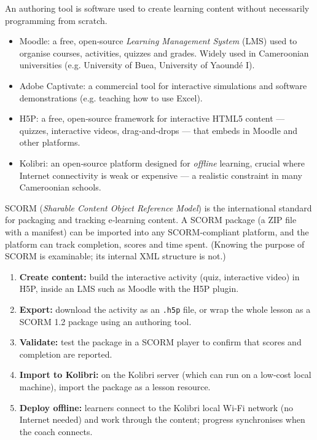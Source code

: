 \documentclass[11pt]{article}
\newcommand{\cle}[1]{{\popxbold\color{popdark}#1}}
\newcounter{popsec}
\newcounter{popsub}
\newcommand{\courssub}[1]{%
  \stepcounter{popsub}%
  \par\vspace{9pt}\noindent{\popxbold\fontsize{11.5}{13}\selectfont\color{popink}{\color{poporange}\thepopsec.\thepopsub}\hspace{6pt}#1}\par\nopagebreak\vspace{4pt}
}
\begin{document}
\courssub{Authoring Tools for CAL}

An \cle{authoring tool} is software used to create learning content without necessarily programming from scratch.

\begin{itemize}
\item \cle{Moodle}: a free, open‑source \emph{Learning Management System} (LMS) used to organise courses, activities, quizzes and grades. Widely used in Cameroonian universities (e.g. University of Buea, University of Yaoundé I).
\item \cle{Adobe Captivate}: a commercial tool for interactive simulations and software demonstrations (e.g. teaching how to use Excel).
\item \cle{H5P}: a free, open‑source framework for interactive HTML5 content — quizzes, interactive videos, drag‑and‑drops — that embeds in Moodle and other platforms.
\item \cle{Kolibri}: an open‑source platform designed for \emph{offline} learning, crucial where Internet connectivity is weak or expensive — a realistic constraint in many Cameroonian schools.
\end{itemize}

\begin{propriete}[SCORM]
\cle{SCORM} (\emph{Sharable Content Object Reference Model}) is the international \cle{standard for packaging and tracking e‑learning content}. A SCORM package (a ZIP file with a manifest) can be imported into any SCORM‑compliant platform, and the platform can track completion, scores and time spent. (Knowing the purpose of SCORM is examinable; its internal XML structure is not.)
\end{propriete}

\begin{methode}
\begin{enumerate}
\item \textbf{Create content:} build the interactive activity (quiz, interactive video) in H5P, inside an LMS such as Moodle with the H5P plugin.
\item \textbf{Export:} download the activity as an \texttt{.h5p} file, or wrap the whole lesson as a SCORM 1.2 package using an authoring tool.
\item \textbf{Validate:} test the package in a SCORM player to confirm that scores and completion are reported.
\item \textbf{Import to Kolibri:} on the Kolibri server (which can run on a low‑cost local machine), import the package as a lesson resource.
\item \textbf{Deploy offline:} learners connect to the Kolibri local Wi‑Fi network (no Internet needed) and work through the content; progress synchronises when the coach connects.
\end{enumerate}
\end{methode}
\end{document}
